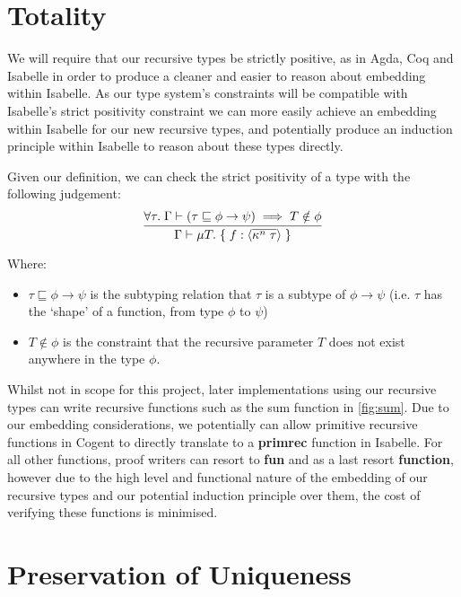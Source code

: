 \FloatBarrier

\section{Totality}

We will require that our recursive types be strictly positive, as in Agda,
Coq and Isabelle in order to produce a cleaner and easier to reason about
embedding within Isabelle. As our type system's constraints will be compatible with Isabelle's
strict positivity constraint we can more easily achieve an embedding within Isabelle for our new
recursive types, and potentially produce an induction principle within Isabelle to reason
about these types directly.

Given our definition, we can check the strict positivity of a type with the following judgement:
$$
\infer{
    \Gamma \vdash \mu T.\; \{\; f: \langle \overline{\kappa^n\; \tau} \rangle\; \}
}{
   \forall \tau.\; \Gamma \vdash (\tau \sqsubseteq \phi \rightarrow \psi) \implies T \notin \phi
}
$$

Where:
\begin{itemize}
    \item 
        $\tau \sqsubseteq \phi \rightarrow \psi$ is the subtyping relation that $\tau$ 
        is a subtype of $\phi \rightarrow \psi$ 
        (i.e. $\tau$ has the `shape' of a function, from type $\phi$ to $\psi$) 
    \item
        $T \notin \phi$ is the constraint that the recursive parameter $T$ 
        does not exist anywhere in the type $\phi$.
\end{itemize}

Whilst not in scope for this project, later implementations using our recursive types can
write recursive functions such as the sum function in \autoref{fig:sum}. Due to our embedding
considerations, we potentially can allow primitive recursive functions in Cogent to 
directly translate to a \textbf{primrec} function in Isabelle. For all other functions,
proof writers can resort to \textbf{fun} and as a last resort \textbf{function}, however
due to the high level and functional nature of the embedding of our recursive types
and our potential induction principle over them, the cost of verifying these functions
is minimised.

\section{Preservation of Uniqueness}


